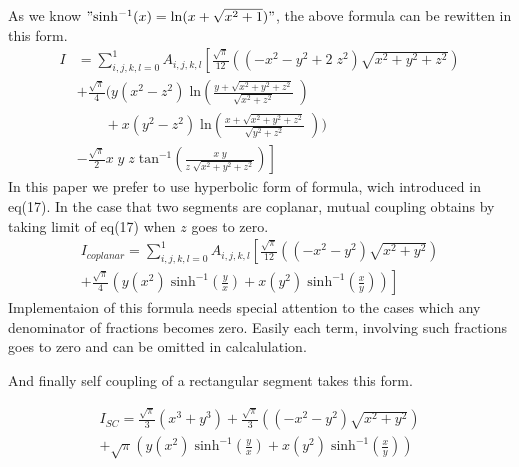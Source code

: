 \documentclass[twoside,twocolumn]{article}
\begin{document}
As we know $"\mathrm{sinh^{-1}}(x) = \mathrm{ln}(x+\sqrt{x^2 + 1})"$,
the above formula can be rewitten in this form.
\begin{equation}\label {eq:18}
\begin{array}{ll}
I&=\sum_{i,j,k,l=0}^1 A_{i,j,k,l}\left[\frac {\sqrt{\pi} } {12} \left((-x^2-y^2+2\;z^2)\sqrt{x^2 + y^2 + z^2} \right)\right.  \\

& + \frac {\sqrt{\pi} } {4} \bigg( y(x^2 - z^2)\;\mathrm{ln}(\frac{y+\sqrt{ {x^2 + y^2 + z^2}}}{\sqrt{x^2 + z^2}}\;)\\
&\ \ \ \ \ \ \ \ \ +x(y^2-z^2)\; \mathrm{ln}(\frac{x+\sqrt{ {x^2 + y^2 + z^2}}}{\sqrt{y^2 + z^2}}\;)  \bigg)\\ 
&- \left. \frac {\sqrt{\pi} } {2}x \;y\;z\;\mathrm{tan^{-1}}(\frac{x\;y}{z\;\sqrt{x^2+y^2 + z^2}} ) \right]

\end{array}
\end{equation}
In this paper we prefer to use hyperbolic form of formula, wich introduced in eq(17).
In the case that two segments are coplanar, mutual coupling obtains by taking limit of eq(17) when $z$ goes to zero.
\begin{equation}\label {eq:19}
\begin{array}{l}
I_{coplanar}=\sum_{i,j,k,l=0}^1 A_{i,j,k,l}\left[\frac {\sqrt{\pi} } {12} \left((-x^2-y^2)\sqrt{x^2 + y^2} \right) \right. \\

 + \left. \frac {\sqrt{\pi} } {4} \left( y(x^2 )\;\mathrm{sinh^{-1}}(\frac{y}{x })+x(y^2)\;\mathrm{sinh^{-1}}(\frac{x}{y})  \right) \right]
\end{array}
\end{equation}
Implementaion of this formula needs special attention to the cases which any denominator of fractions becomes zero. Easily each term, involving such fractions goes to zero and can be omitted in calcalulation.


And finally self coupling of a rectangular segment takes this form.

\begin{equation}\label {eq:20}
\begin{array}{l}
I_{SC} = \frac {\sqrt{\pi} } {3} (x^3+y^3)
+ \frac {\sqrt{\pi} } {3} \left((-x^2-y^2) \sqrt{x^2 + y^2} \right)\nonumber \\ +\sqrt{\pi} \left( y(x^2 )\;\mathrm{sinh^{-1}}(\frac{y}{x})+x(y^2)\;\mathrm{sinh^{-1}}(\frac{x}{y})  \right)
\end{array}
\end{equation}
\end{document}
